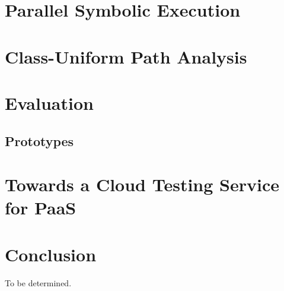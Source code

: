 \documentclass[letterpaper,12pt]{book}
\begin{document}
\chapter{Parallel Symbolic Execution}




\chapter{Class-Uniform Path Analysis}




\chapter{Evaluation}


\section{Prototypes}


\chapter{Towards a Cloud Testing Service for PaaS}




\chapter{Conclusion}

To be determined.



\end{document}
